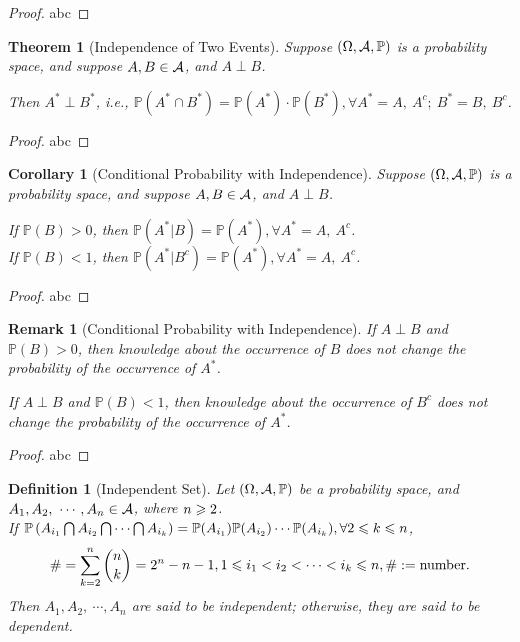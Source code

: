 \documentclass[openany,12pt]{book}
\newtheorem{theorem}{Theorem}[chapter]
\newtheorem{corollary}{Corollary}[chapter]
\newtheorem{remark}{Remark}[chapter]
\newtheorem{definition}{Definition}[chapter]
\begin{document}
\begin{proof}
  abc
\end{proof}

\begin{theorem}[Independence of Two Events]
Suppose $(\Omega,\mathcal{A},\mathbb{P})$ is a probability space, and suppose $A,B\in\mathcal{A}$, and $A\perp B$.

Then $A^*\perp B^*$, i.e., $\mathbb{P}(A^*\cap B^* )=\mathbb{P}(A^* )\cdot \mathbb{P}(B^* ),\forall  A^*=A,\ A^c;\ B^*=B,\ B^c$. 
\end{theorem}

\begin{proof}
  abc
\end{proof}

\begin{corollary}[Conditional Probability with Independence]
Suppose $(\Omega,\mathcal{A},\mathbb{P})$ is a probability space, and suppose $A,B\in\mathcal{A}$, and $A\perp B$.

If $\mathbb{P}(B)>0$, then $\mathbb{P}(A^*|B)=\mathbb{P}(A^* ),\forall A^*=A,\ A^c$.\\
If $\mathbb{P}(B)<1$, then $\mathbb{P}(A^*|B^c )=\mathbb{P}(A^* ),\forall A^*=A,\ A^c$.

\end{corollary}

\begin{proof}
  abc
\end{proof}

\begin{remark}[Conditional Probability with Independence]
If $A\perp B$ and $\mathbb{P}(B)>0$, then knowledge about the occurrence of $B$ does not change the probability of the occurrence of $A^*$.

If $A\perp B$ and $\mathbb{P}(B)<1$, then knowledge about the occurrence of $B^c$  does not change the probability of the occurrence of $A^*$.

\end{remark}

\begin{proof}
  abc
\end{proof}

\begin{definition}[Independent Set]
Let $(\Omega,\mathcal{A},\mathbb{P})$ be a probability space, and $A_1,A_2,\ \cdots,A_n\in\ma$, where $n\geqslant2$.\\
If $\mathbb{P}\left(A_{i_1}\bigcap A_{i_2}\bigcap\cdots\bigcap A_{i_k}\right)=\mathbb{P}(A_{i_1} )\mathbb{P}(A_{i_2})\cdots \mathbb{P}(A_{i_k } ),\forall 2\leqslant k\leqslant n$,
$$ \#=\sum_{k=2}^n \binom n k=2^n-n-1,1\leqslant i_1<i_2<\cdots<i_k\leqslant n,\#:= \text{number}.$$
Then $A_1,A_2,\ \cdots,A_{n }$ are said to be independent; otherwise, they are said to be dependent.
\vspace{0.05cm}
\end{definition}
\end{document}
